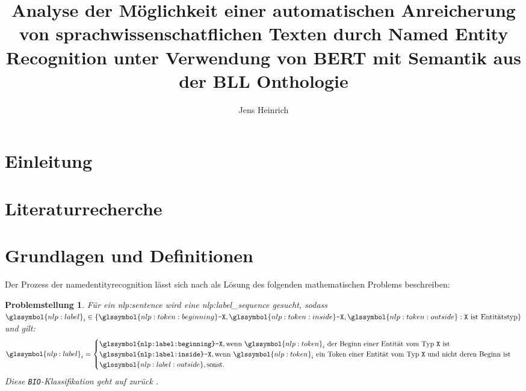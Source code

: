 \documentclass[
german,
]{bachelor}
\author{Jens Heinrich}
\title{%
Analyse der Möglichkeit
einer automatischen Anreicherung von sprachwissenschatflichen Texten
durch Named Entity Recognition
unter Verwendung von BERT
mit Semantik aus der BLL Onthologie%
}
\newtheorem{prob}{Problemstellung}
\begin{document}
\maketitle

\tableofcontents

\section{Einleitung}

\section{Literaturrecherche}

\section{Grundlagen und Definitionen}
Der Prozess der \gls{namedentityrecognition}
lässt sich nach \autocite{2006.15509} als Lösung des folgenden mathematischen Problems beschreiben:

\begin{prob}{}\label{prob:nlp:ner}
Für ein \gls{nlp:sentence} 
wird eine \gls{nlp:label_sequence}  gesucht,
sodass \(
\glssymbol{nlp:label}_i \in
\left\lbrace
	\glssymbol{nlp:token:beginning}\texttt{-X},
	\glssymbol{nlp:token:inside}\texttt{-X},
	\glssymbol{nlp:token:outside}
	:
	\text{\texttt{X} ist Entitätstyp}
\right\rbrace
\)
und gilt:
\[
	\glssymbol{nlp:label}_i =
	\begin{cases}
		\texttt{\glssymbol{nlp:label:beginning}-X},
		\text{wenn \(\glssymbol{nlp:token}_i\)
		der Beginn einer Entität vom Typ \(\texttt{X}\) ist
	}\\
	\texttt{\glssymbol{nlp:label:inside}-X},
		\text{wenn \(\glssymbol{nlp:token}_i\)
		ein Token einer Entität vom Typ \(\texttt{X}\)
		und nicht deren Beginn ist
	}\\
	\glssymbol{nlp:label:outside}, \text{sonst}.
\end{cases}
\]
Diese \texttt{BIO}-Klassifikation geht auf \citeauthor{10.1145/2396761.2398506} zurück \autocite{10.1145/2396761.2398506}.
\end{prob}
\end{document}
